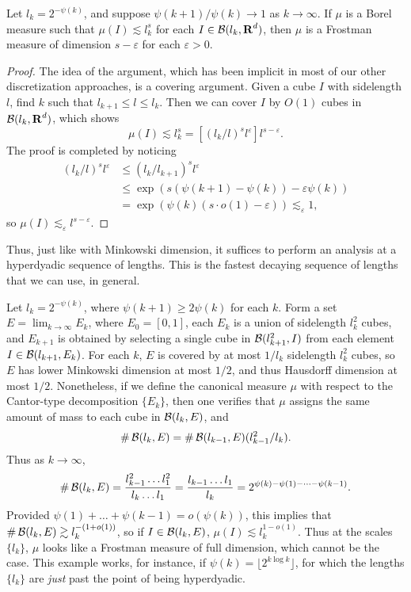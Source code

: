 \begin{theorem} \label{easyCoverTheorem}
	Let $l_k = 2^{-\psi(k)}$, and suppose $\psi(k+1)/\psi(k) \to 1$ as $k \to \infty$. If $\mu$ is a Borel measure such that $\mu(I) \lesssim l_k^s$ for each $I \in \operatorname{\mathcal{B}}(l_k,\operatorname{\mathbf{R}}^d)$, then $\mu$ is a Frostman measure of dimension $s - \varepsilon$ for each $\varepsilon > 0$.
\end{theorem}
\begin{proof}
	The idea of the argument, which has been implicit in most of our other discretization approaches, is a covering argument. Given a cube $I$ with sidelength $l$, find $k$ such that $l_{k+1} \leq l \leq l_k$. Then we can cover $I$ by $O(1)$ cubes in $\operatorname{\mathcal{B}}(l_k,\operatorname{\mathbf{R}}^d)$, which shows
	\[ \mu(I) \lesssim l_k^s = [(l_k/l)^s l^\varepsilon ] l^{s-\varepsilon}. \]
	The proof is completed by noticing
	\begin{align*}
		(l_k/l)^s l^\varepsilon &\leq (l_k/l_{k+1})^s l^\varepsilon\\
		&\leq \exp(s(\psi(k+1) - \psi(k)) - \varepsilon \psi(k))\\
		&= \exp(\psi(k)(s \cdot o(1) - \varepsilon)) \lesssim_\varepsilon 1,
	\end{align*}
	so $\mu(I) \lesssim_\varepsilon l^{s-\varepsilon}$.
\end{proof}

Thus, just like with Minkowski dimension, it suffices to perform an analysis at a hyperdyadic sequence of lengths. This is the fastest decaying sequence of lengths that we can use, in general.

\begin{example}
	Let $l_k = 2^{-\psi(k)}$, where $\psi(k+1) \geq 2\psi(k)$ for each $k$. Form a set $E = \lim_{k \to \infty} E_k$, where $E_0 = [0,1]$, each $E_k$ is a union of sidelength $l_k^2$ cubes, and $E_{k+1}$ is obtained by selecting a single cube in $\operatorname{\mathcal{B}}(l_{k+1}^2,I)$ from each element $I \in \operatorname{\mathcal{B}}(l_{k+1}, E_k)$. For each $k$, $E$ is covered by at most $1/l_k$ sidelength $l_k^2$ cubes, so $E$ has lower Minkowski dimension at most $1/2$, and thus Hausdorff dimension at most $1/2$. Nonetheless, if we define the canonical measure $\mu$ with respect to the Cantor-type decomposition $\{ E_k \}$, then one verifies that $\mu$ assigns the same amount of mass to each cube in $\operatorname{\mathcal{B}}(l_k,E)$, and
	\[ \# \operatorname{\mathcal{B}}(l_k,E) = \# \operatorname{\mathcal{B}}(l_{k-1},E) (l_{k-1}^2/l_k). \]
	Thus as $k \to \infty$,
	\[ \# \operatorname{\mathcal{B}}(l_k,E) = \frac{l_{k-1}^2 \dots l_1^2}{l_k \dots l_1} = \frac{l_{k-1} \dots l_1}{l_k} = 2^{\psi(k) - \psi(1) - \dots - \psi(k-1)}. \]
	Provided $\psi(1) + \dots + \psi(k-1) = o(\psi(k))$, this implies that $\# \operatorname{\mathcal{B}}(l_k,E) \gtrsim l_k^{-(1 + o(1))}$, so if $I \in \operatorname{\mathcal{B}}(l_k,E)$, $\mu(I) \lesssim l_k^{1 - o(1)}$. Thus at the scales $\{ l_k \}$, $\mu$ looks like a Frostman measure of full dimension, which cannot be the case. This example works, for instance, if $\psi(k) = \lfloor 2^{k \log k} \rfloor$, for which the lengths $\{ l_k \}$ are \emph{just} past the point of being hyperdyadic.
\end{example}

